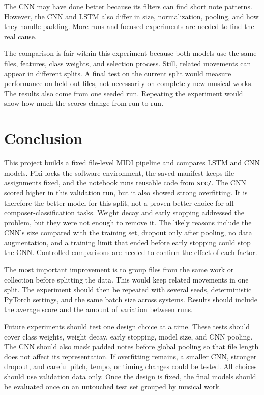 \documentclass[stu, floatsintext]{apa7}
\begin{document}
The CNN may have done better because its filters can find short note patterns.
However, the CNN and LSTM also differ in size, normalization, pooling, and how
they handle padding. More runs and focused experiments are needed to find the
real cause.

The comparison is fair within this experiment because both models use the same
files, features, class weights, and selection process. Still, related movements
can appear in different splits. A final test on the current split would measure
performance on held-out files, not necessarily on completely new musical works.
The results also come from one seeded run. Repeating the experiment would show
how much the scores change from run to run.

\section{Conclusion}
This project builds a fixed file-level MIDI pipeline and compares LSTM and CNN
models. Pixi locks the software environment, the saved manifest keeps file
assignments fixed, and the notebook runs reusable code from \texttt{src/}. The
CNN scored higher in this validation run, but it also showed strong overfitting.
It is therefore the better model for this split, not a proven better choice for
all composer-classification tasks. Weight decay and early stopping addressed the
problem, but they were not enough to remove it. The likely reasons include the
CNN's size compared with the training set, dropout only after pooling, no data
augmentation, and a training limit that ended before early stopping could stop
the CNN. Controlled comparisons are needed to confirm the effect of each factor.

The most important improvement is to group files from the same work or collection
before splitting the data. This would keep related movements in one split. The
experiment should then be repeated with several seeds, deterministic PyTorch
settings, and the same batch size across systems. Results should include the
average score and the amount of variation between runs.

Future experiments should test one design choice at a time. These tests should
cover class weights, weight decay, early stopping, model size, and CNN pooling.
The CNN should also mask padded notes before global pooling so that file length
does not affect its representation. If overfitting remains, a smaller CNN,
stronger dropout, and careful pitch, tempo, or timing changes could be tested.
All choices should use validation data only. Once the design is fixed, the final
models should be evaluated once on an untouched test set grouped by musical work.

\printbibliography
\end{document}
